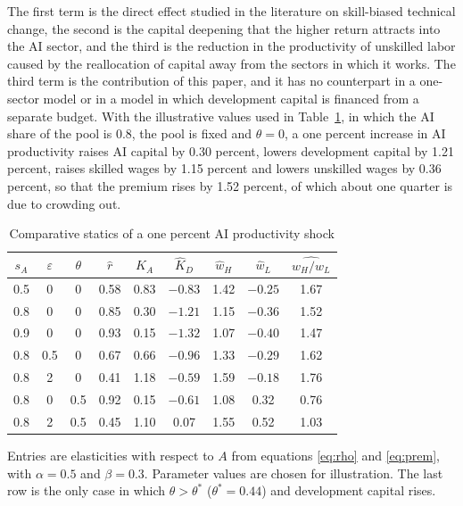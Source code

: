 \documentclass[AER]{AEA}
\newcommand{\sA}{s_A}
\begin{document}
The first term is the direct effect studied in the literature on skill-biased technical change, the second is the capital deepening that the higher return attracts into the AI sector, and the third is the reduction in the productivity of unskilled labor caused by the reallocation of capital away from the sectors in which it works. The third term is the contribution of this paper, and it has no counterpart in a one-sector model or in a model in which development capital is financed from a separate budget. With the illustrative values used in Table~\ref{tab:cs}, in which the AI share of the pool is 0.8, the pool is fixed and $\theta=0$, a one percent increase in AI productivity raises AI capital by 0.30 percent, lowers development capital by 1.21 percent, raises skilled wages by 1.15 percent and lowers unskilled wages by 0.36 percent, so that the premium rises by 1.52 percent, of which about one quarter is due to crowding out.

\begin{table}
\caption{Comparative statics of a one percent AI productivity shock}\label{tab:cs}
\begin{tabular}{ccccccccc}
\toprule
$\sA$ & $\varepsilon$ & $\theta$ & $\hat{r}$ & $\hat{K}_A$ & $\hat{K}_D$ & $\hat{w}_H$ & $\hat{w}_L$ & $\widehat{w_H/w_L}$ \\
\midrule
0.5 & 0 & 0 & 0.58 & 0.83 & $-0.83$ & 1.42 & $-0.25$ & 1.67 \\
0.8 & 0 & 0 & 0.85 & 0.30 & $-1.21$ & 1.15 & $-0.36$ & 1.52 \\
0.9 & 0 & 0 & 0.93 & 0.15 & $-1.32$ & 1.07 & $-0.40$ & 1.47 \\
0.8 & 0.5 & 0 & 0.67 & 0.66 & $-0.96$ & 1.33 & $-0.29$ & 1.62 \\
0.8 & 2 & 0 & 0.41 & 1.18 & $-0.59$ & 1.59 & $-0.18$ & 1.76 \\
0.8 & 0 & 0.5 & 0.92 & 0.15 & $-0.61$ & 1.08 & 0.32 & 0.76 \\
0.8 & 2 & 0.5 & 0.45 & 1.10 & 0.07 & 1.55 & 0.52 & 1.03 \\
\bottomrule
\end{tabular}
\begin{tablenotes}
Entries are elasticities with respect to $A$ from equations \eqref{eq:rho} and \eqref{eq:prem}, with $\alpha=0.5$ and $\beta=0.3$. Parameter values are chosen for illustration. The last row is the only case in which $\theta>\theta^{*}$ ($\theta^{*}=0.44$) and development capital rises.
\end{tablenotes}
\end{table}
\end{document}
